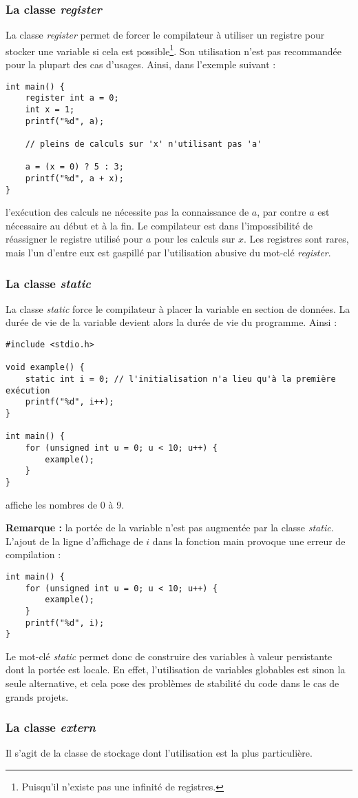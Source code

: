 \documentclass[../../../main.tex]{subfiles}
\begin{document}
\subsubsection{La classe \textit{register}}
La classe \textit{register} permet de forcer le compilateur à utiliser un registre pour stocker une variable si cela est possible\footnote{Puisqu'il n'existe pas une infinité de registres.}. Son utilisation n'est pas recommandée pour la plupart des cas d'usages. Ainsi, dans l'exemple suivant :
\begin{verbatim}
int main() {
	register int a = 0;
	int x = 1;
	printf("%d", a);
	
	// pleins de calculs sur 'x' n'utilisant pas 'a'
	
	a = (x = 0) ? 5 : 3;
	printf("%d", a + x);
}
\end{verbatim}
l'exécution des calculs ne nécessite pas la connaissance de $a$, par contre $a$ est nécessaire au début et à la fin. Le compilateur est dans l'impossibilité de réassigner le registre utilisé pour $a$ pour les calculs sur $x$. Les registres sont rares, mais l'un d'entre eux est gaspillé par l'utilisation abusive du mot-clé \textit{register}. 
\subsubsection{La classe \textit{static}}
La classe \textit{static} force le compilateur à placer la variable en section de données. La durée de vie de la variable devient alors la durée de vie du programme. Ainsi :
\begin{verbatim}
#include <stdio.h>

void example() {
	static int i = 0; // l'initialisation n'a lieu qu'à la première exécution
	printf("%d", i++);
}

int main() {
	for (unsigned int u = 0; u < 10; u++) {
		example();
	}
}
\end{verbatim}
affiche les nombres de 0 à 9.

\textbf{Remarque :} la portée de la variable n'est pas augmentée par la classe \textit{static}. L'ajout de la ligne d'affichage de $i$ dans la fonction \textsf{main} provoque une erreur de compilation :
\begin{verbatim}
int main() {
	for (unsigned int u = 0; u < 10; u++) {
		example();
	}
	printf("%d", i);
}
\end{verbatim}
Le mot-clé \textit{static} permet donc de construire des variables à valeur persistante dont la portée est locale. En effet, l'utilisation de variables globables est sinon la seule alternative, et cela pose des problèmes de stabilité du code dans le cas de grands projets.
\subsubsection{La classe \textit{extern}}
Il s'agit de la classe de stockage dont l'utilisation est la plus particulière.
\end{document}
